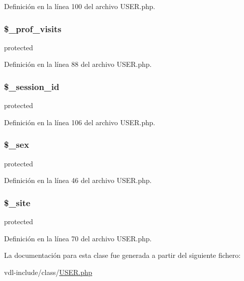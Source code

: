Definición en la línea 100 del archivo U\-S\-E\-R.\-php.

\hypertarget{classUSER_a8386ebedb107e6834cad8da7d83a8328}{
\subsubsection[{\$\-\_\-prof\-\_\-visits}]{\setlength{\rightskip}{0pt plus 5cm}\$\-\_\-prof\-\_\-visits\hspace{0.3cm}{\ttfamily [protected]}}}\label{classUSER_a8386ebedb107e6834cad8da7d83a8328}
protected 

Definición en la línea 88 del archivo U\-S\-E\-R.\-php.

\hypertarget{classUSER_a92023c94926d17b1f6705c8b1d35a103}{
\subsubsection[{\$\-\_\-session\-\_\-id}]{\setlength{\rightskip}{0pt plus 5cm}\$\-\_\-session\-\_\-id\hspace{0.3cm}{\ttfamily [protected]}}}\label{classUSER_a92023c94926d17b1f6705c8b1d35a103}
protected 

Definición en la línea 106 del archivo U\-S\-E\-R.\-php.

\hypertarget{classUSER_a0daa294c691b0e2ab4878e2fc06b6706}{
\subsubsection[{\$\-\_\-sex}]{\setlength{\rightskip}{0pt plus 5cm}\$\-\_\-sex\hspace{0.3cm}{\ttfamily [protected]}}}\label{classUSER_a0daa294c691b0e2ab4878e2fc06b6706}
protected 

Definición en la línea 46 del archivo U\-S\-E\-R.\-php.

\hypertarget{classUSER_a67945a9e82178c5ceac503d9b26f39b5}{
\subsubsection[{\$\-\_\-site}]{\setlength{\rightskip}{0pt plus 5cm}\$\-\_\-site\hspace{0.3cm}{\ttfamily [protected]}}}\label{classUSER_a67945a9e82178c5ceac503d9b26f39b5}
protected 

Definición en la línea 70 del archivo U\-S\-E\-R.\-php.



La documentación para esta clase fue generada a partir del siguiente fichero\-:\begin{DoxyCompactItemize}
\item 
vdl-\/include/class/\hyperlink{USER_8php}{U\-S\-E\-R.\-php}\end{DoxyCompactItemize}
